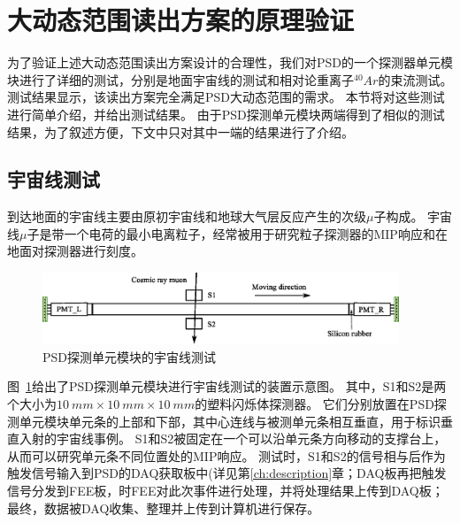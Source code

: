 \section{大动态范围读出方案的原理验证}
\label{sec:dynamic_range:verification}
为了验证上述大动态范围读出方案设计的合理性，我们对PSD的一个探测器单元模块进行了详细的测试，分别是地面宇宙线的测试和相对论重离子$^{40}Ar$的束流测试。
测试结果显示，该读出方案完全满足PSD大动态范围的需求。
本节将对这些测试进行简单介绍，并给出测试结果。
由于PSD探测单元模块两端得到了相似的测试结果，为了叙述方便，下文中只对其中一端的结果进行了介绍。

\subsection{宇宙线测试}
\label{sec:dynamic_range:cosmic_ray}
到达地面的宇宙线主要由原初宇宙线和地球大气层反应产生的次级$\mu$子构成。
宇宙线$\mu$子是带一个电荷的最小电离粒子，经常被用于研究粒子探测器的MIP响应和在地面对探测器进行刻度。

\begin{figure}[htbp]
	\centering
	\includegraphics[width=0.95\textwidth]{chap/dynamic_range/fig/cosmic_test.eps}
	\caption{PSD探测单元模块的宇宙线测试}
	\label{fig:dynamic_range:cosmic_test}
\end{figure}
图~\ref{fig:dynamic_range:cosmic_test}给出了PSD探测单元模块进行宇宙线测试的装置示意图。
其中，S1和S2是两个大小为$\SI{10}{mm} \times \SI{10}{mm} \times \SI{10}{mm}$的塑料闪烁体探测器。
它们分别放置在PSD探测单元模块单元条的上部和下部，其中心连线与被测单元条相互垂直，用于标识垂直入射的宇宙线事例。
S1和S2被固定在一个可以沿单元条方向移动的支撑台上，从而可以研究单元条不同位置处的MIP响应。
测试时，S1和S2的信号相与后作为触发信号输入到PSD的DAQ获取板中(详见第\ref{ch:description}章；DAQ板再把触发信号分发到FEE板，时FEE对此次事件进行处理，并将处理结果上传到DAQ板；最终，数据被DAQ收集、整理并上传到计算机进行保存。

